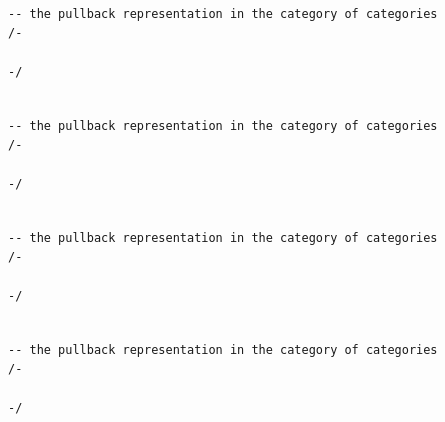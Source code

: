 \documentclass{book}
\newcounter{lcounter}
\begin{document}
\begin{center}
\begin{tcolorbox}[width=5in,colback={white},title={\begin{center}\texttt{Lean \thelcounter} \addtocounter{lcounter}{1}  \end{center}},colbacktitle=Blue,coltitle=black]
\begin{verbatim}

-- the pullback representation in the category of categories
/-

-/

\end{verbatim}%
\end{tcolorbox}
\end{center}


\begin{center}
\begin{tcolorbox}[width=5in,colback={white},title={\begin{center}\texttt{Lean \thelcounter} \addtocounter{lcounter}{1}  \end{center}},colbacktitle=Blue,coltitle=black]
\begin{verbatim}

-- the pullback representation in the category of categories
/-

-/

\end{verbatim}%
\end{tcolorbox}
\end{center}

\begin{center}
\begin{tcolorbox}[width=5in,colback={white},title={\begin{center}\texttt{Lean \thelcounter} \addtocounter{lcounter}{1}  \end{center}},colbacktitle=Blue,coltitle=black]
\begin{verbatim}

-- the pullback representation in the category of categories
/-

-/

\end{verbatim}%
\end{tcolorbox}
\end{center}


\begin{center}
\begin{tcolorbox}[width=5in,colback={white},title={\begin{center}\texttt{Lean \thelcounter} \addtocounter{lcounter}{1}  \end{center}},colbacktitle=Blue,coltitle=black]
\begin{verbatim}

-- the pullback representation in the category of categories
/-

-/

\end{verbatim}%
\end{tcolorbox}
\end{center}
\end{document}
